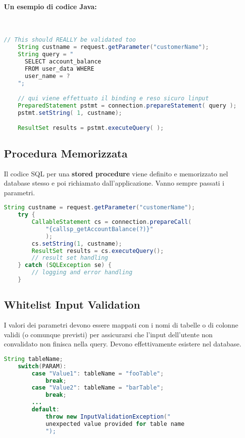 \paragraph{Un esempio di codice Java:} \

\begin{lstlisting}[language=Java]
    // This should REALLY be validated too
    String custname = request.getParameter("customerName");
    String query = "
      SELECT account_balance 
      FROM user_data WHERE
      user_name = ? 
    ";

    // qui viene effettuato il binding e reso sicuro linput
    PreparedStatement pstmt = connection.prepareStatement( query );
    pstmt.setString( 1, custname);

    ResultSet results = pstmt.executeQuery( );
\end{lstlisting}

\subsection{Procedura Memorizzata}

Il codice SQL per una \textbf{stored procedure} viene definito e memorizzato nel
database stesso e
poi richiamato dall'applicazione. Vanno sempre passati i parametri.

\begin{lstlisting}[language=Java, caption=Esempio di codice Java che
    sfrutta una \textit{stored procedure}]
    String custname = request.getParameter("customerName");
    try {
        CallableStatement cs = connection.prepareCall(
            "{callsp_getAccountBalance(?)}"
            );
        cs.setString(1, custname);
        ResultSet results = cs.executeQuery();
        // result set handling
    } catch (SQLException se) {
        // logging and error handling
    }
\end{lstlisting}

\subsection{Whitelist Input Validation}

I valori dei parametri devono essere mappati con i nomi di tabelle o di colonne
validi (o comunque previsti) per assicurarsi che l'input dell'utente non
convalidato non finisca nella
query. Devono effettivamente esistere nel database.

\begin{lstlisting}[language=Java, caption=Esempio di codic Java che effettua 
    input validation tramite whitelist.]
    String tableName;
    switch(PARAM):
        case "Value1": tableName = "fooTable";
            break;
        case "Value2": tableName = "barTable";
            break;
        ...
        default: 
            throw new InputValidationException("
            unexpected value provided for table name
            ");
\end{lstlisting}

